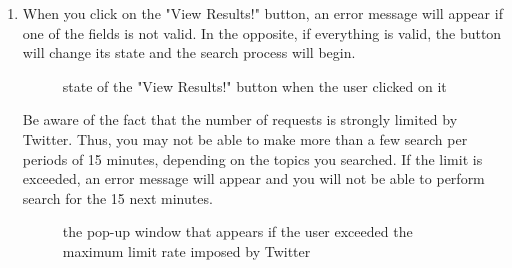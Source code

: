 \documentclass[a4paper,11pt]{report}
\begin{document}
\begin{enumerate}
	\item When you click on the "View Results!" button, an error message will appear if one of the fields is not valid. In the opposite, if everything is valid, the button will change its state and the search process will begin.
	\begin{figure}[H]
	\vspace{-5pt}
	\begin{center}
	\vspace{-5pt}
	\caption{state of the "View Results!" button when the user clicked on it}
	\end{center}
	\end{figure}
	\vspace{-10pt}
	\newpage
	
	Be aware of the fact that the number of requests is strongly limited by Twitter. Thus, you may not be able to make more than a few search per periods of 15 minutes, depending on the topics you searched. If the limit is exceeded, an error message will appear and you will not be able to perform search for the 15 next minutes.
	\begin{figure}[H]
	\vspace{-5pt}
	\begin{center}
	\vspace{-5pt}
	\caption{the pop-up window that appears if the user exceeded the maximum limit rate imposed by Twitter}
	\end{center}
	\end{figure}
	\vspace{-10pt}	
	

\end{enumerate}
\end{document}
